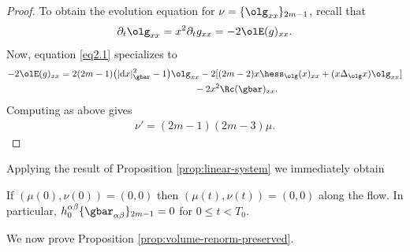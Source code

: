 \begin{proof}
To obtain the evolution equation for $\nu = \{\olg_{xx}\}_{2m-1}$, recall that
\begin{gather*}%
\partial_t \olg_{xx} = x^2 \partial_t g_{xx} = - 2 \olE( g )_{xx}.
\end{gather*}
Now, equation \eqref{eq2.1} specializes to
\begin{gather*}%
-2\olE( g )_{xx} =2(2m-1) \big(|{\rm d}x|^2_{\gbar}-1\big) \olg_{xx} -2 [ (2m-2) x\hess_{\olg} (x)_{xx} +(x\Delta_{\olg} x) \olg_{xx} ]\\
\hphantom{-2\olE( g )_{xx} =}{} -2x^2 \Rc(\gbar)_{xx} .
\end{gather*}
Computing as above gives
\begin{gather*}%
\nu' = (2m-1)(2m-3) \mu.\tag*{\qed}
\end{gather*}\renewcommand{\qed}{}
\end{proof}

Applying the result of Proposition \ref{prop:linear-system} we immediately obtain
\begin{Corollary} \label{corollary3.4}
If $(\mu(0), \nu(0)) = (0,0)$ then $(\mu(t), \nu(t)) = (0,0)$ along the flow. In particular, $h_0^{\alpha \beta} \{\gbar_{\alpha \beta}\}_{2m-1} = 0$ for $0 \leq t < T_0$.
\end{Corollary}

We now prove Proposition \ref{prop:volume-renorm-preserved}.

